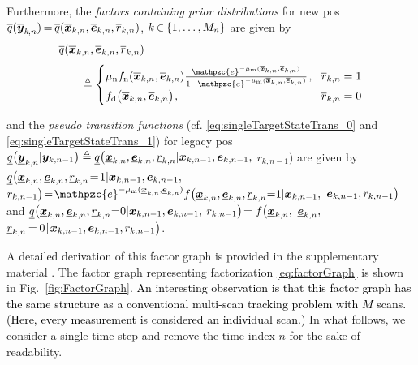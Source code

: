 \documentclass[10pt, twoside, romanappendices]{IEEEtran}
\providecommand{\rd}{\textcolor{black}}
\providecommand{\ist}{\hspace*{.3mm}}
\providecommand{\rmv}{\hspace*{-.3mm}}
\providecommand{\nn}{\nonumber}
\begin{document}
Furthermore, the \textit{factors containing prior distributions} for new \acp{po} $\overline{q}(\overline{\V{y}}_{k\rmv,n}) \rmv=\rmv \overline{q}(\overline{\V{x}}_{k,n}, \overline{\V{e}}_{k,n},  \overline{r}_{k,n})$, $k \rmv\in\rmv \{1,\dots,M_n\}$ are given by
\begin{align}
&\overline{q}(\overline{\V{x}}_{k,n},\overline{\V{e}}_{k,n},\overline{r}_{k,n})  \nn\\[1mm]
&\hspace{6mm}\,\triangleq \begin{cases}
      \mu_{\mathrm{n}} f_{\mathrm{n}}(\overline{\V{x}}_{k,n}, \overline{\V{e}}_{k,n}) \frac{\mathpzc{e}^{-\mu_{\mathrm{m}} (\overline{\V{x}}_{k,n},\overline{\V{e}}_{k,n})}}{1 - \mathpzc{e}^{-\mu_{\mathrm{m}} (\overline{\V{x}}_{k,n},\overline{\V{e}}_{k,n})}} \ist, 
       & \rmv\rmv \overline{r}_{k,n} = 1 \\[1mm]
     f_{\mathrm{d}}\big(\overline{\V{x}}_{k,n}, \overline{\V{e}}_{k,n}\big) \ist,  & \rmv\rmv \overline{r}_{k,n} = 0
  \end{cases} \nn\\[-9.5mm]
    \nn\\
  \nn
\end{align}
and the \textit{pseudo transition functions} (cf. \eqref{eq:singleTargetStateTrans_0} and \eqref{eq:singleTargetStateTrans_1}) for legacy \acp{po} $\underline{q}\big(\underline{\bm{y}}_{k,n} | \bm{y}_{k,n-1} \big) \triangleq \underline{q}\big(\underline{\bm{x}}_{k,n}, \underline{\bm{e}}_{k,n}, \underline{r}_{k,n} | \bm{x}_{k,n-1}, \bm{e}_{k,n-1},$ $ r_{k,n-1} \big)$ are given \vspace{0mm}  by $\underline{q}\big(\underline{\V{x}}_{k,n}, \underline{\V{e}}_{k,n}, \underline{r}_{k,n} \rmv\rmv= \rmv\rmv1 | \V{x}_{k,n-1}, \V{e}_{k,n-1},$ $r_{k,n-1} \big) \rmv\rmv=\rmv\rmv \mathpzc{e}^{-\mu_{\mathrm{m}}(\underline{\V{x}}_{k,n},\underline{\V{e}}_{k,n})} f\big(\underline{\V{x}}_{k,n}, \underline{\V{e}}_{k,n},\underline{r}_{k,n} \rmv\rmv\rmv=\rmv\rmv\rmv  1 | \V{x}_{k,n-1},$ $\bm{e}_{k,n-1}, r_{k,n-1} \big) $ and $\underline{q}\big(\underline{\V{x}}_{k,n}, \underline{\V{e}}_{k,n}, \underline{r}_{k,n} \rmv\rmv\rmv =\rmv\rmv\rmv   0 | \V{x}_{k,n-1},\V{e}_{k,n-1},$ $r_{k,n-1} \big) \rmv\rmv= f\big(\underline{\V{x}}_{k,n},$ $\underline{\bm{e}}_{k,n},$ $\underline{r}_{k,n} \rmv=\rmv  0 \ist | \ist \V{x}_{k,n-1}, \V{e}_{k,n-1}, r_{k,n-1} \big)$.


A detailed derivation of this factor graph is provided in the supplementary material \cite{MeyWil:SM21}. The factor graph representing factorization \eqref{eq:factorGraph} is shown in Fig.~\ref{fig:FactorGraph}.  \rd{An interesting observation is that this factor graph has the same structure as a conventional multi-scan tracking problem \cite{MeyKroWilLauHlaBraWin:J18,WilLau:J18} with $M$ scans. (Here, every measurement is considered an individual scan.)} In what follows, we consider a single time step and remove the time index $n$ for the sake of readability.
 
\end{document}
